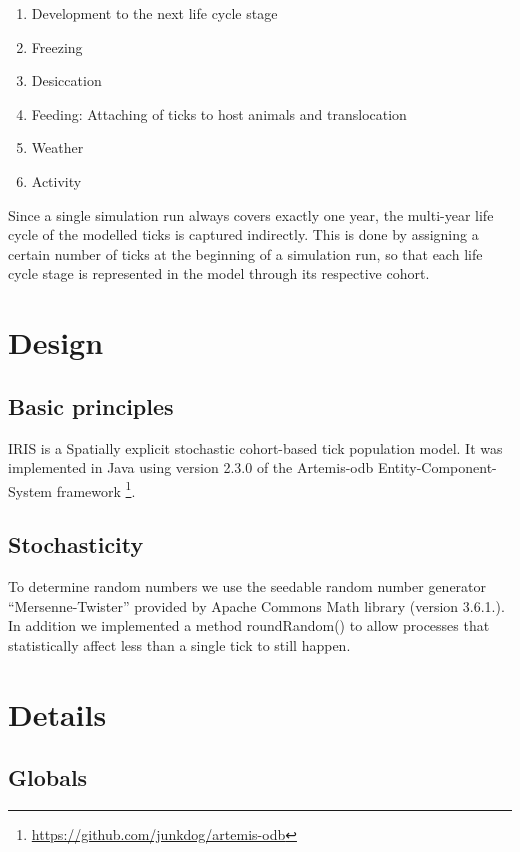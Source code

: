 \documentclass[a4paper, 11pt]{scrartcl}
\begin{document}
\begin{enumerate}
	\item Development to the next life cycle stage
	\item Freezing
	\item Desiccation
	\item Feeding: Attaching of ticks to host animals and translocation
	\item Weather
	\item Activity
\end{enumerate}

Since a single simulation run always covers exactly one year, the multi-year life cycle of the modelled ticks is captured indirectly.
This is done by assigning a certain number of ticks at the beginning of a simulation run, so that each life cycle stage is represented in
the model through its respective cohort.


\newpage
\section{Design}


\subsection{Basic principles}
IRIS is a Spatially explicit stochastic cohort-based tick population model. It was implemented in Java using version 2.3.0 of the Artemis-odb Entity-Component-System framework
\footnote{\url{https://github.com/junkdog/artemis-odb}}.

\subsection{Stochasticity}
To determine random numbers we use the seedable random number generator ``Mersenne-Twister'' provided by Apache Commons Math library
(version 3.6.1.). In addition we implemented a method roundRandom() to allow processes that statistically affect less than
a single tick to still happen.


\newpage
\section{Details}

\subsection{Globals}
\end{document}
